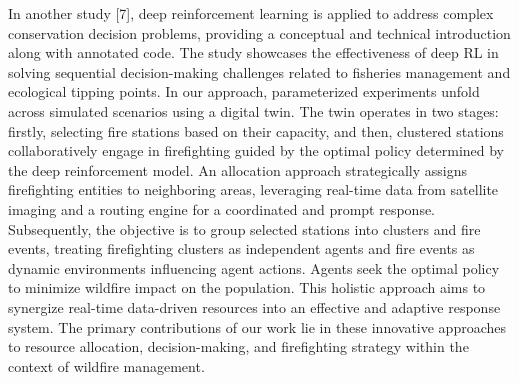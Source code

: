 \documentclass[lettersize,journal]{IEEEtran}
\begin{document}
In another study [7], deep reinforcement learning is applied to address complex conservation decision problems, providing a conceptual and technical introduction along with annotated code. The study showcases the effectiveness of deep RL in solving sequential decision-making challenges related to fisheries management and ecological tipping points.
In our approach, parameterized experiments unfold across simulated scenarios using a digital twin. The twin operates in two stages: firstly, selecting fire stations based on their capacity, and then, clustered stations collaboratively engage in firefighting guided by the optimal policy determined by the deep reinforcement model. An allocation approach strategically assigns firefighting entities to neighboring areas, leveraging real-time data from satellite imaging and a routing engine for a coordinated and prompt response.
Subsequently, the objective is to group selected stations into clusters and fire events, treating firefighting clusters as independent agents and fire events as dynamic environments influencing agent actions. Agents seek the optimal policy to minimize wildfire impact on the population. This holistic approach aims to synergize real-time data-driven resources into an effective and adaptive response system. The primary contributions of our work lie in these innovative approaches to resource allocation, decision-making, and firefighting strategy within the context of wildfire management.
\end{document}
